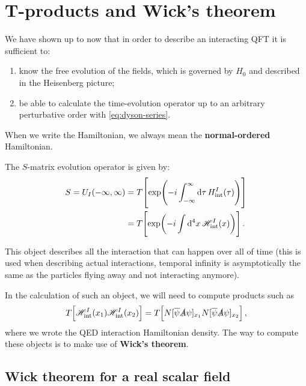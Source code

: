 \documentclass[main.tex]{subfiles}
\begin{document}
\section{T-products and Wick's theorem}


We have shown up to now that in order to describe an interacting QFT it is sufficient to: 
\begin{enumerate}
    \item know the free evolution of the fields, which is governed by \(H_0 \) and described in the Heisenberg picture;
    \item be able to calculate the time-evolution operator up to an arbitrary perturbative order with \eqref{eq:dyson-series}. 
\end{enumerate}

When we write the Hamiltonian, we always mean the \textbf{normal-ordered} Hamiltonian. 

\begin{definition}
The \(S\)-matrix evolution operator is given by:
%
\begin{align}
S = U_I (- \infty , \infty )
&= T \qty[\exp(-i \int_{- \infty }^{\infty } \dd{\tau }H _{\text{int}}^{I} (\tau ))]  \\
&= T \qty[\exp(-i \int \dd[4]{x} \mathscr{H} _{\text{int}}^{I} (x))]
\,.
\end{align}
\end{definition}

This object describes all the interaction that can happen over all of time (this is used when describing actual interactions, temporal infinity is asymptotically the same as the particles flying away and not interacting anymore).

In the calculation of such an object, we will need to compute products such as 
%
\begin{align}
T \qty[\mathscr{H} _{\text{int}}^{I}(x_1 ) \mathscr{H} _{\text{int}}^{I}(x_2 )] 
= T \qty[ N[\overline{\psi} \slashed{A} \psi ]_{x_1 }N[\overline{\psi} \slashed{A} \psi ]_{x_2 }]
\,,
\end{align}
%
where we wrote the QED interaction Hamiltonian density. The way to compute these objects is to make use of \textbf{Wick's theorem}. 

\subsection{Wick theorem for a real scalar field}
\end{document}
